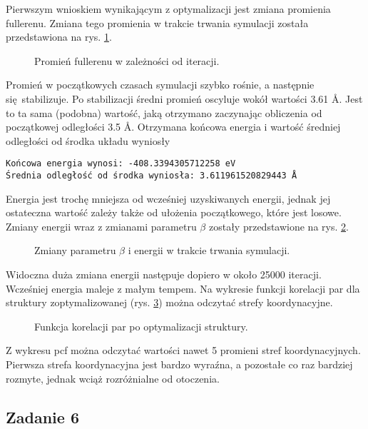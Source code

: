 \documentclass[a4paper,12pt]{article}
\begin{document}
	\noindent Pierwszym wnioskiem wynikającym z optymalizacji jest zmiana promienia fullerenu. 
	Zmiana tego promienia w trakcie trwania symulacji została przedstawiona na rys. 
	\ref{task5_r}.
	\begin{figure}[h]
		\centering
		
		\caption{Promień fullerenu w zależności od iteracji.}
		\label{task5_r}
	\end{figure}
	
	\noindent Promień w początkowych czasach symulacji szybko rośnie, a następnie się stabilizuje.
	Po stabilizacji średni promień oscyluje wokół wartości 3.61 \AA. 
	Jest to ta sama (podobna) wartość, jaką otrzymano zaczynając obliczenia od początkowej odległości 3.5 \AA.
	Otrzymana końcowa energia i wartość średniej odległości od środka układu wyniosły
	\begin{verbatim}
Końcowa energia wynosi: -408.3394305712258 eV
Średnia odległość od środka wyniosła: 3.611961520829443 Å
	\end{verbatim}
	Energia jest trochę mniejsza od wcześniej uzyskiwanych energii, jednak jej ostateczna wartość zależy także od ułożenia początkowego, które jest losowe. 
	Zmiany energii wraz z zmianami parametru $\beta$ zostały przedstawione na rys. \ref{task5_beta}.
	\begin{figure}[H]
		\centering
		
		\caption{Zmiany parametru $\beta$ i energii w trakcie trwania symulacji.}
		\label{task5_beta}
	\end{figure}	
	
	\noindent Widoczna duża zmiana energii następuje dopiero w około 25000 iteracji. 
	Wcześniej energia maleje z małym tempem.
	Na wykresie funkcji korelacji par dla struktury zoptymalizowanej (rys. \ref{task5_pcf}) można odczytać strefy koordynacyjne.
	\begin{figure}[H]
		\centering
		
		\caption{Funkcja korelacji par po optymalizacji struktury.}
		\label{task5_pcf}
	\end{figure}
	
	\noindent Z wykresu pcf można odczytać wartości nawet 5 promieni stref koordynacyjnych.
	Pierwsza strefa koordynacyjna jest bardzo wyraźna, a pozostałe co raz bardziej rozmyte, jednak wciąż rozróżnialne od otoczenia.
	
	\subsection*{Zadanie 6}
	
\end{document}
